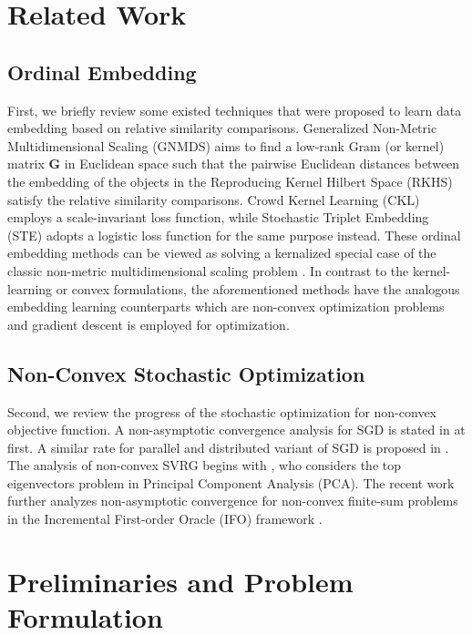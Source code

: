 \documentclass[letterpaper]{article}
\newcommand{\qqxu}[1]{\textcolor[rgb]{0.00,1.00,0.00}{#1}}
\begin{document}
		\section{Related Work}

		\subsection{Ordinal Embedding}

		First, we briefly review some existed techniques that were proposed to learn data embedding based on relative similarity comparisons. Generalized Non-Metric Multidimensional Scaling (GNMDS) \cite{agarwal2007generalized} aims to find a low-rank Gram (or kernel) matrix $\mathbf{G}$ in Euclidean space such that the pairwise Euclidean distances between the embedding of the objects in the Reproducing Kernel Hilbert Space (RKHS) satisfy the relative similarity comparisons. Crowd Kernel Learning (CKL) \cite{tamuz2011adaptiive} \qqxu{employs} a scale-invariant loss function, \qqxu{while} Stochastic Triplet Embedding (STE) \cite{vandermaaten2012stochastic} \qqxu{adopts} a logistic loss function for the same purpose \qqxu{instead}. These ordinal embedding methods can be viewed as solving a \qqxu{kernalized} special case of the classic non-metric multidimensional scaling problem \cite{Shepard1962a,Shepard1962b,Kruskal1964a,Kruskal1964b}. In contrast to the kernel-learning or convex formulations, the aforementioned methods have the analogous embedding learning counterparts which are non-convex optimization problems and gradient descent is employed for optimization.

		\subsection{Non-Convex Stochastic Optimization}
		Second, we review the progress of the stochastic optimization for non-convex objective function. A non-asymptotic convergence analysis for SGD is stated in \cite{ghadimi2013stochastic} at first. A similar rate for parallel and distributed variant of SGD is \qqxu{proposed} in \cite{NIPS2015_5751}. The analysis of non-convex SVRG begins with \cite{icml2015_shamir15}, who considers the top eigenvectors problem in Principal Component Analysis (PCA). The recent work \cite{reddic2016nonconvex} further \qqxu{analyzes} non-asymptotic convergence for non-convex finite-sum problems in the Incremental First-order Oracle (IFO) framework \cite{icml2015_agarwal15}.

		\section{Preliminaries and Problem Formulation}
\end{document}

